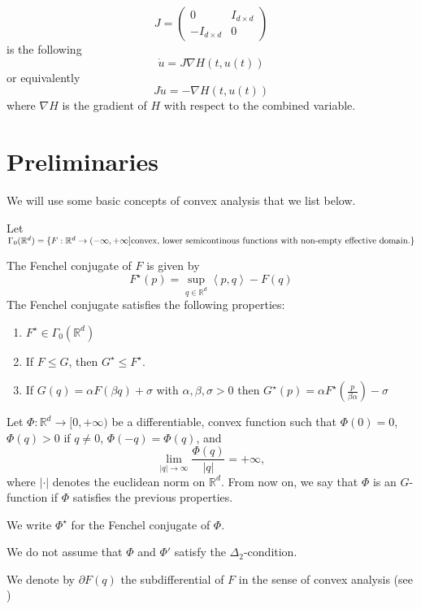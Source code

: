 \documentclass[twoside]{article}
\theoremstyle{remark}
\newcommand{\rr}{\mathbb{R}}
\renewcommand{\leq}{\leqslant}
\newcommand{\Phie}{\Phi^{\star}}
\begin{document}
\[J=
\begin{pmatrix}
0&I_{d\times d}
\\
-I_{d\times d}&0
\end{pmatrix}
\]
is the following 
\begin{equation}
\dot{u}=J \nabla H(t,u(t))
\end{equation}
or equivalently
\begin{equation}
J\dot{u}=- \nabla H(t,u(t))
\end{equation}
where $\nabla H$ is the gradient of $H$ with respect to the combined variable.

\section{Preliminaries}
We will use some basic concepts of convex analysis that we list below.

Let $\Gamma_0(\rr^d)=\{F:\rr^d\to (-\infty,+\infty]
\\
\mbox {convex, lower semicontinous functions with non-empty effective domain.}\}$

The Fenchel conjugate of $F$ is given by
\[
F^\star(p)=\sup\limits_{q \in \rr^d} \left\langle p,q\right\rangle-F(q)
\]
The Fenchel conjugate satisfies the following properties:
\begin{enumerate}
\item $F^\star \in \Gamma_0(\rr^d)$
\item If $F\leq G$, then  $G^\star \leq F^\star$.
\item If $G(q)=\alpha F(\beta q)+\sigma$ with $\alpha,\beta,\sigma>0$ then
$G^\star(p)=\alpha F^\star(\frac{p}{\beta \alpha})-\sigma$
\end{enumerate}

Let $\Phi:\mathbb{R}^d\to [0,+\infty)$ be  a differentiable, convex function such that $\Phi(0)=0$, $\Phi(q)>0$ if $q\neq 0$, $\Phi(-q)=\Phi(q)$,
 and
\begin{equation}\label{eq:N-sub-inf}
\lim_{|q|\to\infty}\frac{\Phi(q)}{|q|}=+\infty,
\end{equation}
where $|\cdot|$ denotes the euclidean norm on $\rr^d$. From now on, we say that $\Phi$ is an $G$-function if $\Phi$ satisfies the previous properties.

We write $\Phie$ for the Fenchel conjugate of $\Phi$.

We do not assume  that $\Phi$ and $\Phi'$ satisfy the $\Delta_2$-condition.


We denote by  $\partial F(q)$ the subdifferential of $F$ in the sense of convex analysis (see \cite{clarke1990optimization,clarke2013functional})
\end{document}
